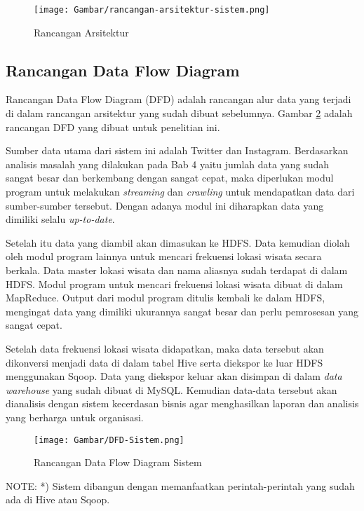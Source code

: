 \begin{figure}[H]
	\centering
	\texttt{[image: Gambar/rancangan-arsitektur-sistem.png]}
	\caption[Rancangan Arsitektur]{Rancangan Arsitektur} 
	\label{fig:rancangan_arsitektur}
\end{figure}


\subsection{Rancangan Data Flow Diagram}
Rancangan Data Flow Diagram (DFD) adalah rancangan alur data yang terjadi di dalam rancangan arsitektur yang sudah dibuat sebelumnya. Gambar \ref{fig:rancangan_dfd} adalah rancangan DFD yang dibuat untuk penelitian ini. 

Sumber data utama dari sistem ini adalah Twitter dan Instagram. Berdasarkan analisis masalah yang dilakukan pada Bab 4 yaitu jumlah data yang sudah sangat besar dan berkembang dengan sangat cepat, maka diperlukan modul program untuk melakukan \textit{streaming} dan \textit{crawling} untuk mendapatkan data dari sumber-sumber tersebut. Dengan adanya modul ini diharapkan data yang dimiliki selalu \textit{up-to-date}.

Setelah itu data yang diambil akan dimasukan ke HDFS. Data kemudian diolah oleh modul program lainnya untuk mencari frekuensi lokasi wisata secara berkala. Data master lokasi wisata dan nama aliasnya sudah terdapat di dalam HDFS. Modul program untuk mencari frekuensi lokasi wisata dibuat di dalam MapReduce. Output dari modul program ditulis kembali ke dalam HDFS, mengingat data yang dimiliki ukurannya sangat besar dan perlu pemrosesan yang sangat cepat.

Setelah data frekuensi lokasi wisata didapatkan, maka data tersebut akan dikonversi menjadi data di dalam tabel Hive serta diekspor ke luar HDFS menggunakan Sqoop. Data yang diekspor keluar akan disimpan di dalam \textit{data warehouse} yang sudah dibuat di MySQL. Kemudian data-data tersebut akan dianalisis dengan sistem kecerdasan bisnis agar menghasilkan laporan dan analisis yang berharga untuk organisasi.

\begin{figure}[H]
	\centering
	\texttt{[image: Gambar/DFD-Sistem.png]}
	\caption[Rancangan Data Flow Diagram Sistem]{Rancangan Data Flow Diagram Sistem} 
	\label{fig:rancangan_dfd}
\end{figure}
NOTE: 
*) Sistem dibangun dengan memanfaatkan perintah-perintah yang sudah ada di Hive atau Sqoop.

